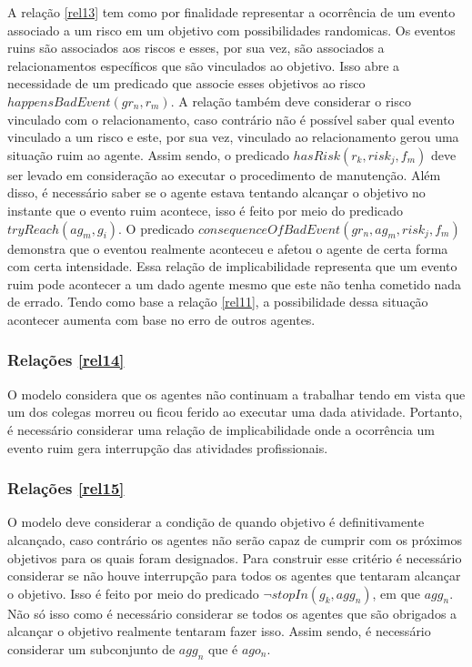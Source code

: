\documentclass[12pt]{article}
\begin{document}
A relação \ref{rel13} tem como por finalidade representar a ocorrência de um evento associado a um risco em um objetivo com possibilidades randomicas. Os eventos ruins são associados aos riscos e esses, por sua vez, são associados a relacionamentos específicos que são vinculados ao objetivo. Isso abre a necessidade de um predicado que associe esses objetivos ao risco $happensBadEvent(gr_n,r_m)$. A relação também deve considerar o risco vinculado com o relacionamento, caso contrário não é possível saber qual evento vinculado a um risco e este, por sua vez, vinculado ao relacionamento gerou uma situação ruim ao agente. Assim sendo, o predicado $hasRisk(r_k,risk_j,f_m)$ deve ser levado em consideração ao executar o procedimento de manutenção. Além disso, é necessário saber se o agente estava tentando alcançar o objetivo no instante que o evento ruim acontece, isso é feito por meio do predicado $tryReach(ag_m,g_i)$. O predicado $consequenceOfBadEvent(gr_n,ag_m,risk_j,f_m)$ demonstra que o eventou realmente aconteceu e afetou o agente de certa forma com certa intensidade. Essa relação de implicabilidade representa que um evento ruim pode acontecer a um dado agente mesmo que este não tenha cometido nada de errado. Tendo como base a relação \ref{rel11}, a possibilidade dessa situação acontecer aumenta com base no erro de outros agentes.

\subsubsection{Relações \ref{rel14}}

O modelo considera que os agentes não continuam a trabalhar tendo em vista que um dos colegas morreu ou ficou ferido ao executar uma dada atividade. Portanto, é necessário considerar uma relação de implicabilidade onde a ocorrência um evento ruim gera interrupção das atividades profissionais. 

\subsubsection{Relações \ref{rel15}}

O modelo deve considerar a condição de quando objetivo é definitivamente alcançado, caso contrário os agentes não serão capaz de cumprir com os próximos objetivos para os quais foram designados. Para construir esse critério é necessário considerar se não houve interrupção para todos os agentes que tentaram alcançar o objetivo. Isso é feito por meio do predicado $\neg stopIn(g_k,agg_n)$, em que $agg_n$. Não só isso como é necessário considerar se todos os agentes que são obrigados a alcançar o objetivo realmente tentaram fazer isso. Assim sendo, é necessário considerar um subconjunto de $agg_n$ que é $ago_n$.   
\end{document}
